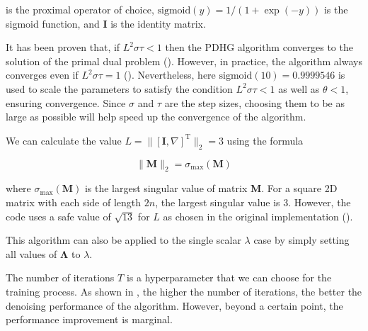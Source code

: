 \documentclass[12pt]{article}
\begin{document}
is the proximal operator of choice,
$\text{sigmoid}(y) = 1 / (1 + \exp(-y))$ is the sigmoid function, and
$\mathbf{I}$ is the identity matrix.

It has been proven that, if $L^2 \sigma \tau < 1$ then the PDHG algorithm converges to the solution of the primal dual problem (\cite{chambolle_pock_2011}).
However, in practice, the algorithm always converges even if $L^2 \sigma \tau = 1$ (\cite{sidky_2012}).
Nevertheless, here $\text{sigmoid}(10) = 0.9999546$ is used to scale the parameters to satisfy the condition $L^2 \sigma \tau < 1$ as well as $\theta < 1$, ensuring convergence.
Since $\sigma$ and $\tau$ are the step sizes, choosing them to be as large as possible will help speed up the convergence of the algorithm.

We can calculate the value $L = \| [\mathbf{I}, \nabla]^\text{T} \|_2 = 3$ using the formula

\begin{equation*}
    \| \mathbf{M} \|_2 = \sigma_{\text{max}}(\mathbf{M})
\end{equation*}

where  $\sigma_{\text{max}}(\mathbf{M})$ is the largest singular value of matrix $\mathbf{M}$.
For a square 2D matrix with each side of length $2n$, the largest singular value is $3$.
However, the code uses a safe value of $\sqrt{13}$ for $L$ as chosen in the original implementation (\cite{dyn_img_pdhg_code}).



This algorithm can also be applied to the single scalar $\lambda$ case by simply setting all values of $\mathbf{\Lambda}$ to $\lambda$.

The number of iterations $T$ is a hyperparameter that we can choose for the training process.
As shown in \cite{kofler2023learning}, the higher the number of iterations, the better the denoising performance of the algorithm. 
However, beyond a certain point, the performance improvement is marginal.

\end{document}
